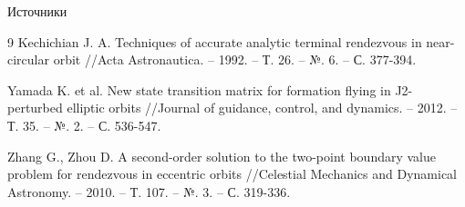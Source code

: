 \documentclass[8pt]{beamer}
\begin{document}
\begin{frame}[allowframebreaks]{Источники}
\begin{thebibliography}{9}
    Kechichian J. A. Techniques of accurate analytic terminal rendezvous in near-circular orbit //Acta Astronautica. – 1992. – Т. 26. – №. 6. – С. 377-394.

    Yamada K. et al. New state transition matrix for formation flying in J2-perturbed elliptic orbits //Journal of guidance, control, and dynamics. – 2012. – Т. 35. – №. 2. – С. 536-547.

    Zhang G., Zhou D. A second-order solution to the two-point boundary value problem for rendezvous in eccentric orbits //Celestial Mechanics and Dynamical Astronomy. – 2010. – Т. 107. – №. 3. – С. 319-336.
    
  \end{thebibliography}
\end{frame}
\end{document}
